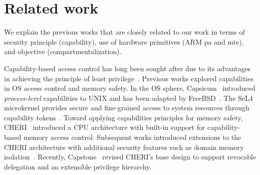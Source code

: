 \section{Related work}
\label{sec:related-work}
We explain the previous works that are closely related to our work in terms of security principle (capability), use of hardware primitives (ARM \gls{pa} and \gls{mte}), and objective (compartmentalization).

\label{sec:related-work:capability}
Capability-based access control has long been sought after due to its advantages in achieving the principle of least privilege~\cite{obj-cap,cap-addressing,eros,watson2010capsicum,cheri,cheri-risc,cheri-jni,jkernel,caja,framer,sel4}.
Previous works explored capabilities in OS access control and memory safety.
In the OS sphere, Capsicum~\cite{watson2010capsicum} introduced \emph{process-level} \fd capabilities to UNIX and has been adapted by FreeBSD~\cite{freebsd-capsicum}.
The SeL4 microkernel provides secure and fine-grained access to system resources through capability tokens~\cite{sel4}.
Toward applying capabilities principles for memory safety, CHERI~\cite{cheri-risc} introduced a CPU architecture with built-in support for capability-based memory access control.
Subsequent works introduced extensions to the CHERI architecture with additional security features such as domain memory isolation~\cite{cheri,cheri-jni,cheriabi}.
Recently, Capstone~\cite{capstone} revised CHERI's base design to support revocable delegation and an extensible privilege hierarchy.

